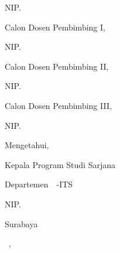 \begin{center}
{{\begin{minipage}{\twocolumns}
                        \vspace{2cm}
                        \underline{\pbb@dua}
                        
                        NIP. \NIP@pbb@dua
                    \end{minipage}
                }
        }
        {
            \newlength{\threecolumns}
            \setlength{\threecolumns}{.3\textwidth}
            \begin{minipage}{\threecolumns}
                \centering
                Calon Dosen Pembimbing I,

                \vspace{2cm}
                \underline{\pbb@satu}
                
                NIP. \NIP@pbb@satu
            \end{minipage}
            \begin{minipage}{\threecolumns}
                \centering
                Calon Dosen Pembimbing II,

                \vspace{2cm}
                \underline{\pbb@dua}
                
                NIP. \NIP@pbb@dua
            \end{minipage}
            \begin{minipage}{\threecolumns}
                \centering
                Calon Dosen Pembimbing III,

                \vspace{2cm}
                \underline{\pbb@tiga}
                
                NIP. \NIP@pbb@tiga
            \end{minipage}
        }

    \vspace{0.5cm}
    Mengetahui,

    Kepala Program Studi Sarjana
    
    Departemen~\@departemen~{\singkatan@fakultas}-ITS

    \vspace{2cm}
    \underline{\@Kaprodi}
    
    NIP. \NIP@Kaprodi

    \vspace{0.5cm}
    Surabaya

    {\@bulan~}, \@tahun
\end{center}
\makeatother